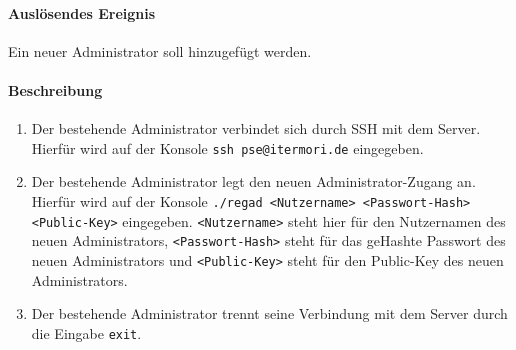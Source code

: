 \paragraph{Auslösendes Ereignis}
Ein neuer \Gls{Administrator} soll hinzugefügt werden.
\paragraph{Beschreibung}
\begin{enumerate}
    \item   Der bestehende \Gls{Administrator} verbindet sich durch \Gls{SSH} mit dem Server.
            Hierfür wird auf der Konsole \texttt{ssh pse@itermori.de} eingegeben.
    \item   Der bestehende \Gls{Administrator} legt den neuen Administrator-Zugang an.
            Hierfür wird auf der Konsole \texttt{./regad <Nutzername> <Passwort-Hash> <Public-Key>} eingegeben.
            \texttt{<Nutzername>} steht hier für den Nutzernamen des neuen \Gls{Administrator}s, \texttt{<Passwort-Hash>} steht für das ge\gls{Hash}te Passwort des neuen Administrators
            und \texttt{<Public-Key>} steht für den \Gls{Public-Key} des neuen \Gls{Administrator}s.
    \item   Der bestehende Administrator trennt seine Verbindung mit dem \Gls{Server} durch die Eingabe \texttt{exit}.
\end{enumerate}
